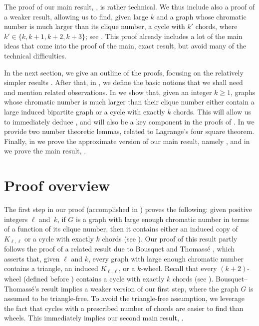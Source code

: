 \documentclass[11pt,english]{article}
\theoremstyle{plain}
\theoremstyle{definition}
\theoremstyle{remark}
\begin{document}
	The proof of our main result, , is rather technical. We thus include also a proof of a weaker result, allowing us to find, given large $k$ and a graph whose chromatic number is much larger than its clique number, a cycle with $k'$ chords, where $k' \in \{k, k+1, k+2, k+3\}$; see .
	This proof already includes a lot of the main ideas that come into the proof of the main, exact result, but avoid many of the technical difficulties.
	
	In the next section, we give an outline of the proofs, focusing on the relatively simpler results . After that, in , we define the basic notions that we shall need and mention related observations. In  we show that, given an integer $k \ge 1$, graphs whose chromatic number is much larger than their clique number either contain a large induced bipartite graph or a cycle with exactly $k$ chords. This will allow us to immediately deduce , and will also be a key component in the proofs of . In  we provide two number theoretic lemmas, related to Lagrange's four square theorem. Finally, in  we prove the approximate version of our main result, namely , and in  we prove the main result, .
	
	
\section{Proof overview} \label{sec:overview}
    
    The first step in our proof (accomplished in ) proves the following: given positive integers $\ell$ and~$k$, if $G$ is a graph with large enough chromatic number in terms of a function of its clique number, then it contains either an induced copy of $K_{\ell, \ell}$ or a cycle with exactly $k$ chords (see ).
    Our proof of this result partly follows the proof of a related result due to Bousquet and Thomass\'e \cite{bousquet-thomasse},
    which asserts that, given $\ell$ and $k$, every graph with large enough chromatic number contains a triangle, an induced $K_{\ell, \ell}$, or a $k$-wheel. 
    Recall that every $(k+2)$-wheel (defined before ) contains a cycle with exactly $k$ chords (see ). Bousquet--Thomass\'e's result implies a weaker version of our first step, where the graph $G$ is assumed to be triangle-free. To avoid the triangle-free assumption, we leverage the fact that cycles with a prescribed number of chords are easier to find than wheels. This immediately implies our second main result, .
    
\end{document}
